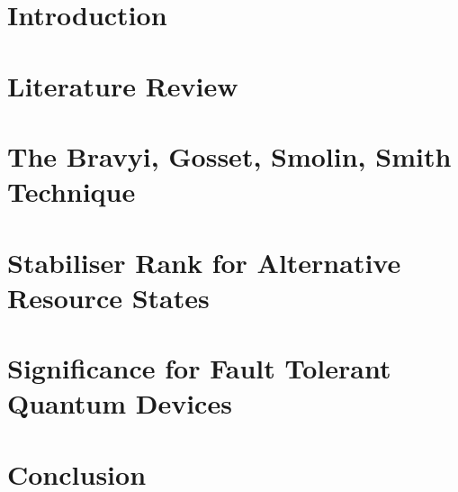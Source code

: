 \documentclass[11pt,a4paper,twoside]{report}
\theoremstyle{plain}%
\theoremstyle{definition}
\theoremstyle{remark}
\begin{document}

\restoregeometry 
\pagestyle{fancy}  %
\fancyhead{} %
\fancyhead[RO,LE]{\thepage} %
\fancyhead[LO]{\slshape\rightmark}
\cfoot{}
\makeatletter
\renewcommand{\chaptermark}[1]{%
 \markboth{}{\MakeUppercase{%
   \ifnum\c@secnumdepth>\m@ne \@chapapp \ \thechapter. \ \fi #1}}%
}
\makeatother
\begin{abstract}
   
\end{abstract}
\tableofcontents
\pagebreak
\chapter{Introduction}\label{chap:intro}

\chapter{Literature Review}\label{chap:litreview}

\chapter{The Bravyi, Gosset, Smolin, Smith Technique}\label{chap:bssg}

\chapter{Stabiliser Rank for Alternative Resource States}\label{chap:results}

\chapter{Significance for Fault Tolerant Quantum Devices}\label{chap:discussion}

\chapter*{Conclusion}\label{chap:conclusion}



\end{document}
